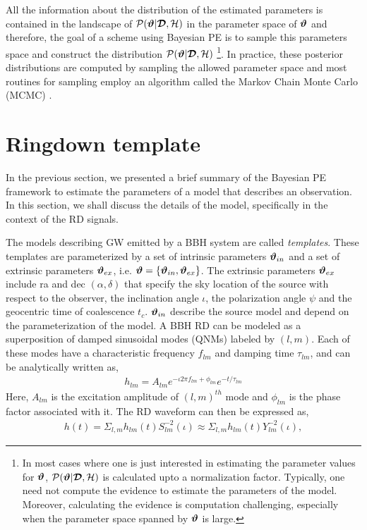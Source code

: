 All the information about the distribution of the estimated parameters is contained in the landscape of $\mathcal{P}(\boldsymbol{\vartheta}|\boldsymbol{\mathcal{D}},\mathcal{H})$ in the parameter space of $\boldsymbol{\vartheta}$ and therefore, the goal of a scheme using Bayesian PE is to sample this parameters space and construct the distribution $\mathcal{P}(\boldsymbol{\vartheta}|\boldsymbol{\mathcal{D}},\mathcal{H})$  \footnote{In most cases where one is just interested in estimating the parameter values for $\boldsymbol{\vartheta}$, $\mathcal{P}(\boldsymbol{\vartheta}|\boldsymbol{\mathcal{D}},\mathcal{H})$ is calculated upto a normalization factor. Typically, one need not compute the evidence to estimate the parameters of the model. Moreover, calculating the evidence is computation challenging, especially when the parameter space spanned by $\boldsymbol{\vartheta}$ is large. }. In practice, these posterior distributions are computed by sampling \cite{sampling} the allowed parameter space and most routines for sampling employ an algorithm called the Markov Chain Monte Carlo (MCMC)  \cite{MCMC1,MCMC2,MCMC3}.   







\section{Ringdown template}
\label{sec:RD-template}
In the previous section, we presented a brief summary of the Bayesian PE framework to estimate the parameters of a model that describes an observation. In this section, we shall discuss the details of the model, specifically in the context of the RD signals. 

The models describing GW emitted by a BBH system are called \textit{templates}. These templates are parameterized by a set of intrinsic parameters $\boldsymbol{\vartheta}_{in}$  and a set of extrinsic parameters $\boldsymbol{\vartheta}_{ex}$, i.e. $\boldsymbol{\vartheta} = \left\lbrace \boldsymbol{\vartheta}_{in}, \boldsymbol{\vartheta}_{ex} \right\rbrace$. The extrinsic parameters $\boldsymbol{\vartheta}_{ex}$ include ra and dec $(\alpha, \delta)$ that specify the sky location of the source with respect to the observer, the inclination angle $\iota$, the polarization angle $\psi$ and the geocentric time of coalescence $t_{c}$. $\boldsymbol{\vartheta}_{in}$ describe  the source model and depend on the parameterization of the model. A BBH RD can be modeled as a superposition of damped sinusoidal modes (QNMs) labeled by $(l,m)$. Each of these modes have a characteristic frequency $f_{lm}$ and damping time $\tau_{lm}$, and can be analytically written as, 
\begin{align}
h_{lm}=A_{lm}e^{-\iota 2 \pi f_{lm} + \phi_{lm}} e^{-t/\tau_{lm}}
\end{align}
Here, $A_{lm}$ is the excitation amplitude of $(l,m)^{th}$ mode and $\phi_{lm}$ is the phase factor associated with it.
The RD waveform can then be expressed as, 
\begin{align}
h(t)= \Sigma_{l, m} h_{lm}(t) S_{lm}^{-2}(\iota) \approx \Sigma_{l, m} h_{lm}(t) Y_{lm}^{-2}(\iota), 
\end{align}

